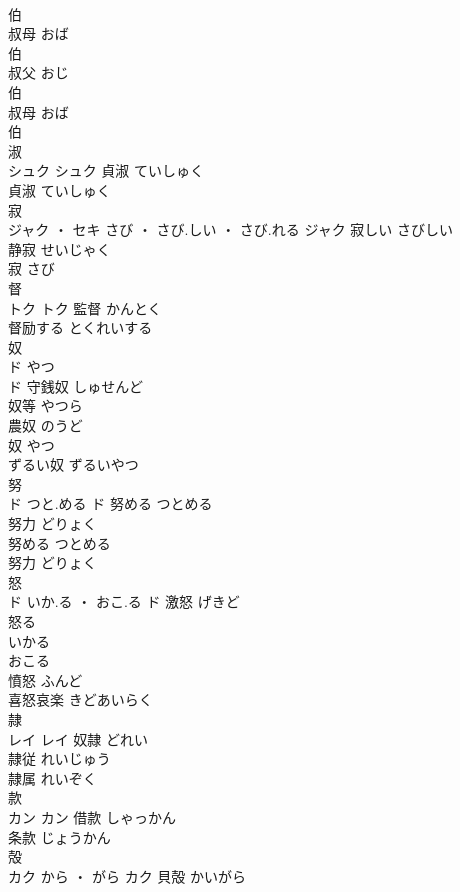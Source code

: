 \documentclass[8pt]{extreport}
\begin{document}
\begin{CJK}{UTF8}{min}
\\	伯 
\\	叔母	おば	
\\	伯 
\\	叔父	おじ	
\\	伯 
\\	叔母	おば	
\\	伯 
\\	淑	
\\	シュク		シュク	貞淑	ていしゅく	
\\	貞淑	ていしゅく	
\\	寂	
\\	ジャク ・ セキ	さび ・ さび.しい ・ さび.れる	ジャク	寂しい	さびしい	
\\	静寂	せいじゃく	
\\	寂	さび	
\\	督	
\\	トク		トク	監督	かんとく	
\\	督励する	とくれいする	
\\	奴	
\\	ド	やつ
\\	ド	守銭奴	しゅせんど	
\\	奴等	やつら	
\\	農奴	のうど	
\\	奴	やつ	
\\	ずるい奴	ずるいやつ	
\\	努	
\\	ド	つと.める	ド	努める	つとめる	
\\	努力	どりょく	
\\	努める	つとめる	
\\	努力	どりょく	
\\	怒	
\\	ド	いか.る ・ おこ.る	ド	激怒	げきど	
\\	怒る 
\\	いかる 
\\	おこる	
\\	憤怒	ふんど	
\\	喜怒哀楽	きどあいらく	
\\	隷	
\\	レイ		レイ	奴隷	どれい	
\\	隷従	れいじゅう	
\\	隷属	れいぞく	
\\	款	
\\	カン		カン	借款	しゃっかん	
\\	条款	じょうかん	
\\	殻	
\\	カク	から ・ がら	カク	貝殻	かいがら	

\end{CJK}
\end{document}
